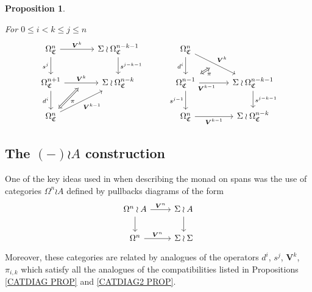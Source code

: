 \documentclass[a4paper,10pt
,draft
]{article}%
\numberwithin{equation}{section}
\numberwithin{figure}{section}
\newtheorem{proposition}[equation]{Proposition}%
\theoremstyle{definition} %
\newcommand{\1}{\ensuremath{\mathbbm 1}}%
\begin{document}
\begin{proposition}
\begin{itemize}
For $0 \leq i < k \leq j \leq n$
\begin{equation}
\begin{tikzcd}[row sep = 20pt, column sep = 35pt]
	\Omega^n_{\mathfrak{C}}
	\arrow{r}[swap,name=U]{}{\boldsymbol{V}^k} \arrow{d}[swap]{s^j} &
	\Sigma \wr \Omega^{n-k-1}_{\mathfrak{C}} \ar{d}{s^{j-k-1}}
&
	\Omega^n_{\mathfrak{C}}
	\arrow{dr}[swap,name=UUU]{}{\boldsymbol{V}^k} \arrow{d}[swap]{d^i} &
\\
	|[alias=V]|
	\Omega^{n+1}_{\mathfrak{C}} \ar{r}{\boldsymbol{V}^{k}}[swap,name=UU]{} \arrow{d}[swap]{d^i}&
	\Sigma \wr \Omega^{n-k}_{\mathfrak{C}}
&
	|[alias=VVV]|
	\Omega^{n-1}_{\mathfrak{C}} \ar{r}[near start, swap]{\boldsymbol{V}^{k-1}}[swap,name=UUUU]{} \ar{d}[swap]{s^{j-1}} &
	\Sigma \wr \Omega^{n-k-1}_{\mathfrak{C}} \ar{d}{s^{j-k-1}}
\\
	|[alias=VV]|
	\Omega^{n}_{\mathfrak{C}} \arrow{ur}[swap]{\boldsymbol{V}^{k-1}} &
&
	|[alias=VVVV]|
	\Omega^{n}_{\mathfrak{C}} \ar{r}[swap]{\boldsymbol{V}^{k-1}} &
	\Sigma \wr \Omega^{n-k}_{\mathfrak{C}}
\arrow[Leftrightarrow, from=VV, to=UU,shorten >=0.05cm,shorten <=0.05cm
,swap,"\pi"
]
\arrow[Leftrightarrow, from=VVV, to=UUU,shorten >=0.05cm,shorten <=0.05cm
,swap,"\pi"
]
\end{tikzcd}
\end{equation}
\end{itemize}
\end{proposition}




\subsection{The $(-)\wr A$ construction}\label{WRACONST SEC}


One of the key ideas used in \cite{BP_geo} when describing the monad on spans was the use of categories 
$\Omega^n \wr A$ defined by pullbacks diagrams of the form
\begin{equation}\label{WRASAMPLE EQ}
\begin{tikzcd}
	\Omega^n \wr A \ar{r}{\boldsymbol{V}^n} \ar{d} &
	\Sigma \wr A  \ar{d}
\\
	\Omega^n \ar{r}{\boldsymbol{V}^n} &
	\Sigma \wr \Sigma
\end{tikzcd}
\end{equation}
Moreover, these categories are related by analogues of the operators $d^i$, $s^j$, $\boldsymbol{V}^k$, $\pi_{i,k}$
which satisfy all the analogues of the compatibilities 
listed in Propositions \ref{CATDIAG PROP} and \ref{CATDIAG2 PROP}.
\end{document}

